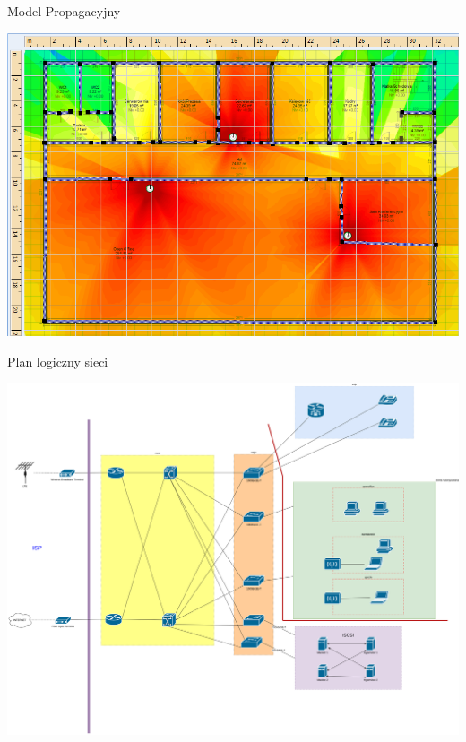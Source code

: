 \documentclass[presentation]{beamer}
\begin{document}
\begin{frame}[label={sec:org759e2e1}]{Model Propagacyjny}
\begin{center}
\includegraphics[width=.9\linewidth]{./data/siec/wifi.png}
\end{center}
\end{frame}
\begin{frame}[label={sec:orgb7354cf}]{Plan logiczny sieci}
\begin{center}
\includegraphics[width=.9\linewidth]{./data/siec/network_diagram_clean.png}
\end{center}
\end{frame}
\end{document}
